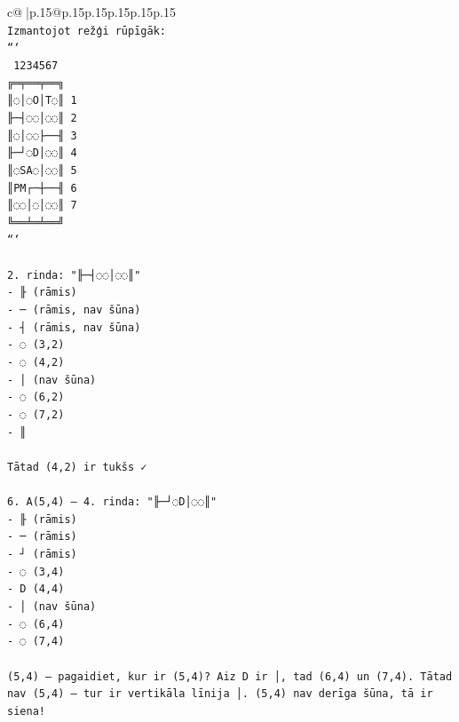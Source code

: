 \documentclass{article}
\begin{document}
{\begin{supertabular}{c@{$\;$}|p{.15\linewidth}@{}p{.15\linewidth}p{.15\linewidth}p{.15\linewidth}p{.15\linewidth}p{.15\linewidth}}
{{{\\ 
\texttt{Izmantojot režģi rūpīgāk:} \\
\texttt{```} \\
\texttt{ 1234567} \\
\texttt{╔═╤══╤══╗} \\
\texttt{║◌│◌O│T◌║ 1} \\
\texttt{╟─┤◌◌│◌◌║ 2} \\
\texttt{║◌│◌◌├──╢ 3} \\
\texttt{╟─┘◌D│◌◌║ 4} \\
\texttt{║◌SA◌│◌◌║ 5} \\
\texttt{║PM┌─┼──╢ 6} \\
\texttt{║◌◌│◌│◌◌║ 7} \\
\texttt{╚══╧═╧══╝} \\
\texttt{```} \\
\\ 
\texttt{2. rinda: "╟─┤◌◌│◌◌║"} \\
\texttt{{-} ╟ (rāmis)} \\
\texttt{{-} ─ (rāmis, nav šūna)} \\
\texttt{{-} ┤ (rāmis, nav šūna)} \\
\texttt{{-} ◌ (3,2)} \\
\texttt{{-} ◌ (4,2)} \\
\texttt{{-} │ (nav šūna)} \\
\texttt{{-} ◌ (6,2)} \\
\texttt{{-} ◌ (7,2)} \\
\texttt{{-} ║} \\
\\ 
\texttt{Tātad (4,2) ir tukšs ✓} \\
\\ 
\texttt{6. A(5,4) — 4. rinda: "╟─┘◌D│◌◌║"} \\
\texttt{{-} ╟ (rāmis)} \\
\texttt{{-} ─ (rāmis)} \\
\texttt{{-} ┘ (rāmis)} \\
\texttt{{-} ◌ (3,4)} \\
\texttt{{-} D (4,4)} \\
\texttt{{-} │ (nav šūna)} \\
\texttt{{-} ◌ (6,4)} \\
\texttt{{-} ◌ (7,4)} \\
\\ 
\texttt{(5,4) — pagaidiet, kur ir (5,4)? Aiz D ir │, tad (6,4) un (7,4). Tātad nav (5,4) — tur ir vertikāla līnija │. (5,4) nav derīga šūna, tā ir siena!} \\
}}}
\end{supertabular}}
\end{document}
